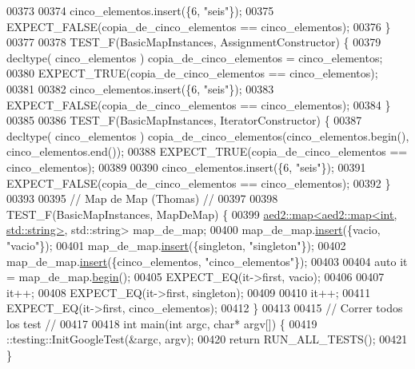 \begin{DoxyCode}
00373 
00374     cinco\_elementos.insert(\{6, \textcolor{stringliteral}{"seis"}\});
00375     EXPECT\_FALSE(copia\_de\_cinco\_elementos == cinco\_elementos);
00376 \}
00377 
00378 TEST\_F(BasicMapInstances, AssignmentConstructor) \{
00379     decltype( cinco\_elementos ) copia\_de\_cinco\_elementos = cinco\_elementos;
00380     EXPECT\_TRUE(copia\_de\_cinco\_elementos == cinco\_elementos);
00381 
00382     cinco\_elementos.insert(\{6, \textcolor{stringliteral}{"seis"}\});
00383     EXPECT\_FALSE(copia\_de\_cinco\_elementos == cinco\_elementos);
00384 \}
00385 
00386 TEST\_F(BasicMapInstances, IteratorConstructor) \{
00387     decltype( cinco\_elementos ) copia\_de\_cinco\_elementos(cinco\_elementos.begin(), cinco\_elementos.end());
00388     EXPECT\_TRUE(copia\_de\_cinco\_elementos == cinco\_elementos);
00389 
00390     cinco\_elementos.insert(\{6, \textcolor{stringliteral}{"seis"}\});
00391     EXPECT\_FALSE(copia\_de\_cinco\_elementos == cinco\_elementos);
00392 \}
00393 
00395 \textcolor{comment}{// Map de Map (Thomas) //}
00397 \textcolor{comment}{}
00398 TEST\_F(BasicMapInstances, MapDeMap) \{
00399     \hyperlink{classaed2_1_1map}{aed2::map<aed2::map<int, std::string>}, std::string> map\_de\_map;
00400     map\_de\_map.\hyperlink{classaed2_1_1map_a6941cde9a79c27f054b5c97a587a1854_a6941cde9a79c27f054b5c97a587a1854}{insert}(\{vacio, \textcolor{stringliteral}{"vacio"}\});
00401     map\_de\_map.\hyperlink{classaed2_1_1map_a6941cde9a79c27f054b5c97a587a1854_a6941cde9a79c27f054b5c97a587a1854}{insert}(\{singleton, \textcolor{stringliteral}{"singleton"}\});
00402     map\_de\_map.\hyperlink{classaed2_1_1map_a6941cde9a79c27f054b5c97a587a1854_a6941cde9a79c27f054b5c97a587a1854}{insert}(\{cinco\_elementos, \textcolor{stringliteral}{"cinco\_elementos"}\});
00403 
00404     \textcolor{keyword}{auto} it = map\_de\_map.\hyperlink{classaed2_1_1map_a58a95705d54b3dda7f775ce5a22225cb_a58a95705d54b3dda7f775ce5a22225cb}{begin}();
00405     EXPECT\_EQ(it->first, vacio);
00406 
00407     it++;
00408     EXPECT\_EQ(it->first, singleton);
00409 
00410     it++;
00411     EXPECT\_EQ(it->first, cinco\_elementos);
00412 \}
00413 
00415 \textcolor{comment}{// Correr todos los test //}
00417 \textcolor{comment}{}
00418 \textcolor{keywordtype}{int} main(\textcolor{keywordtype}{int} argc, \textcolor{keywordtype}{char}* argv[]) \{
00419     ::testing::InitGoogleTest(&argc, argv);
00420   \textcolor{keywordflow}{return} RUN\_ALL\_TESTS();
00421 \}
\end{DoxyCode}
